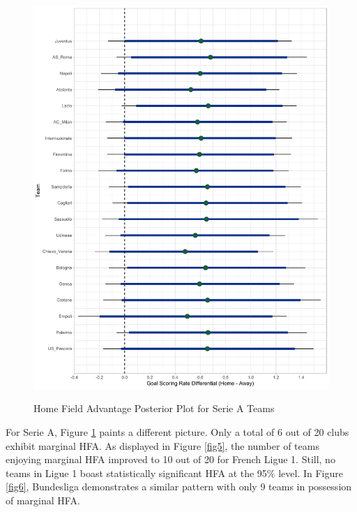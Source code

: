 \documentclass[USenglish]{article}
\begin{document}
\begin{figure}
\caption{Home Field Advantage Posterior Plot for Serie A Teams}
{\includegraphics[width=0.90\linewidth]{HFA_Serie_A11.pdf}}
\label{fig4}
\end{figure}

For Serie A, Figure \ref{fig4} paints a different picture. Only a total of 6 out of 20 clubs exhibit marginal HFA. As displayed in Figure \ref{fig5}, the number of teams enjoying marginal HFA improved to 10 out of 20 for French Ligue 1. Still, no teams in Ligue 1 boast statistically significant HFA at the 95\% level. In Figure \ref{fig6}, Bundesliga demonstrates a similar pattern with only 9 teams in possession of marginal HFA.   
\end{document}
